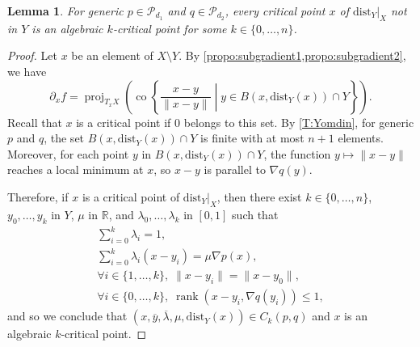 \documentclass{amsart}
\newcommand{\R}{\mathbb{R}}
\newcommand{\dd}{\mathrm{dist}}
\newcommand{\dist}{{\mathrm{dist}_Y|_X}}
\newcommand{\Poly}{\mathscr{P}}
\newtheorem{lemma}[subsubsection]{Lemma}
\theoremstyle{definition}
\theoremstyle{remark}
\begin{document}
\begin{lemma}
\label{L:algebraic-critical-points}
For generic $p\in \Poly_{d_1}$ and $q\in \Poly_{d_2}$, every critical point $x$ of $\dist$ not in $Y$ is an algebraic $k$-critical point for some $k \in \{0, \ldots, n\}$.
\end{lemma}
\begin{proof}
 Let $x$ be an element of {$X \setminus Y$}. By \cref{propo:subgradient1,propo:subgradient2}, we have
\[
\partial_x f = \operatorname{proj}_{T_x X} \left( \operatorname{co} \left\{ \left. \frac{x - y}{\| x - y\|} \; \right| \; y \in B(x, \dd_Y(x)) \cap Y \right\} \right).
\]
Recall that $x$ is a critical point if $0$ belongs to this set. By \cref{T:Yomdin}, for generic $p$ and $q$, the set $B(x, \dd_Y(x)) \cap Y$ is finite with at most $n + 1$ elements. Moreover, for each point $y$ in $B(x, \dd_Y(x)) \cap Y$, the function $y \mapsto \| x - y \|$ reaches a local minimum at $x$, so $x - y$ is parallel to $\nabla q(y)$.

Therefore, if $x$ is a critical point of $\dist$, then there exist $k \in \{0, \ldots, n\}$, $y_0, \ldots, y_k$ in $Y$, $\mu$ in $\R$, and $\lambda_0, \ldots, \lambda_k$ in $[0, 1]$ such that
\begin{equation}
\label{eq:criticalabove}
\begin{gathered}
\sum_{i = 0}^k \lambda_i = 1, \\
\sum_{i = 0}^k \lambda_i (x - y_i) = \mu \nabla p(x), \\
\forall i \in \{1, \ldots, k\}, \; \| x - y_i \| = \| x - y_0 \|, \\
\forall i \in \{0, \ldots, k\}, \; \operatorname{rank}(x - y_i, \nabla q(y_i)) \leq 1,
\end{gathered}
\end{equation}
and so we conclude that $(x, \overline{y}, \overline{\lambda}, \mu, \dd_Y(x)) \in C_k(p, q)$ and $x$ is an algebraic $k$-critical point.
\end{proof}
\end{document}
